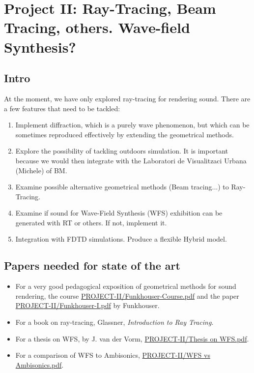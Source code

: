 \documentclass[12pt]{article}
\begin{document}

\newpage
\section{Project II: Ray-Tracing, Beam Tracing, others. Wave-field Synthesis?}

\subsection{Intro}

At the moment, we have only explored ray-tracing for rendering sound.
There are a few features that need to be tackled:

\begin{enumerate}

\item Implement diffraction, which is a purely wave phenomenon, but which can be
sometimes reproduced effectively by extending the geometrical methods.

\item Explore the possibility of tackling outdoors simulation. It is important because
we would then integrate with the Laboratori de Visualitzaci Urbana (Michele) of BM.

\item Examine possible alternative geometrical methods (Beam tracing...) to Ray-Tracing.

\item Examine if sound for Wave-Field Synthesis (WFS) exhibition can be generated
with RT or others. If not, implement it.

\item Integration with FDTD simulations. Produce a flexible Hybrid model.

\end{enumerate}


\subsection{Papers needed for state of the art}

\begin{itemize}

\item
For a very good pedagogical exposition of geometrical methods for sound rendering,
the course \url{PROJECT-II/Funkhouser-Course.pdf} and the paper
\url{PROJECT-II/Funkhouser-I.pdf} by Funkhouser.

\item For a book on ray-tracing, Glassner, {\it Introduction to Ray Tracing}.

\item For a thesis on WFS, by J. van der Vorm, \url{PROJECT-II/Thesis on WFS.pdf}.

\item For a comparison of WFS to Ambisonics, \url{PROJECT-II/WFS vs Ambisonics.pdf}.

\end{itemize}
\end{document}
